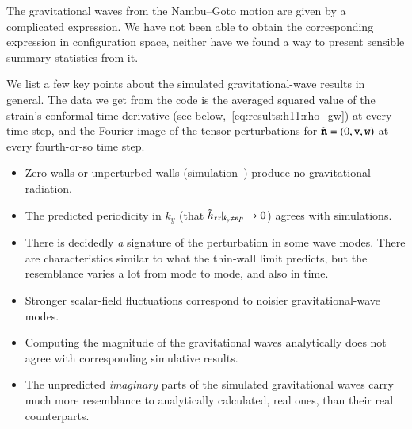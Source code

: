 


\newcommand{\polplus}{\ALIASpolplus}
\newcommand{\polcross}{\ALIASpolcross}
\newcommand\sppt{\ALIASsppt}
\newcommand\Ft{\ALIASFt}
\newcommand{\hpAB}{\ALIAShpAB}
\newcommand{\hpA}{\ALIAShpA}
\newcommand{\hpB}{\ALIAShpB}
\newcommand{\hpC}{\ALIAShpC}
\newcommand{\hpCR}{\ALIAShpCR}
\newcommand{\hpCI}{\ALIAShpCI}
\newcommand{\dummy}{\ALIASdummy}




The gravitational waves from the Nambu--Goto motion are given by a complicated expression. We have not been able to obtain the corresponding expression in configuration space, neither have we found a way to present sensible summary statistics from it. 

We list a few key points about the simulated gravitational-wave results in general. The data we get from the code is the averaged squared value of the strain's conformal time derivative (see below,~\cref{eq:results:h11:rho_gw}) at every time step, and the Fourier image of the tensor perturbations for $\tilde{\boldsymbol{\mathtt{n}}} = (0,\mathtt{v}, \mathtt{w})$ at every fourth-or-so time step.
\begin{itemize}
    \item Zero walls or unperturbed walls (simulation~) produce no gravitational radiation.
    \item The predicted periodicity in $k_y$ (that $\Ft{h}_{xx}\rvert_{k_y\neq np} \to 0 $) agrees with simulations. 
    \item There is decidedly \textit{a} signature of the perturbation in some wave modes. There are characteristics similar to what the thin-wall limit predicts, but the resemblance varies a lot from mode to mode, and also in time.
    \item Stronger scalar-field fluctuations correspond to noisier gravitational-wave modes.
    \item Computing the magnitude of the gravitational waves analytically does not agree with corresponding simulative results. 
    \item The unpredicted \emph{imaginary} parts of the simulated gravitational waves carry much more resemblance to analytically calculated, real ones, than their real counterparts.
\end{itemize}


